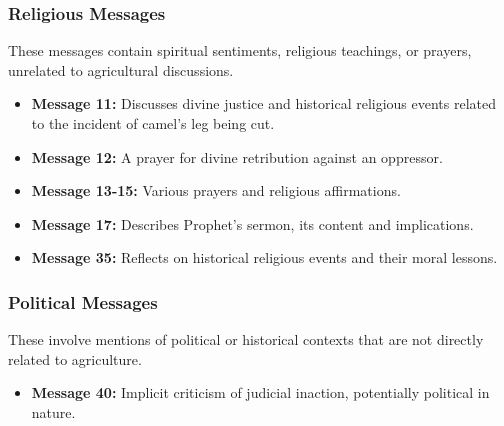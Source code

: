 \documentclass[12pt]{article}
\begin{document}
\subsubsection{Religious Messages}
These messages contain spiritual sentiments, religious teachings, or prayers, unrelated to agricultural discussions.
\begin{itemize}
  \item \textbf{Message 11:} Discusses divine justice and historical religious events related to the incident of camel's leg being cut.
  \item \textbf{Message 12:} A prayer for divine retribution against an oppressor.
  \item \textbf{Message 13-15:} Various prayers and religious affirmations.
  \item \textbf{Message 17:} Describes Prophet's sermon, its content and implications.
  \item \textbf{Message 35:} Reflects on historical religious events and their moral lessons.
\end{itemize}

\subsubsection{Political Messages}
These involve mentions of political or historical contexts that are not directly related to agriculture.
\begin{itemize}
  \item \textbf{Message 40:} Implicit criticism of judicial inaction, potentially political in nature.
\end{itemize}
\end{document}
